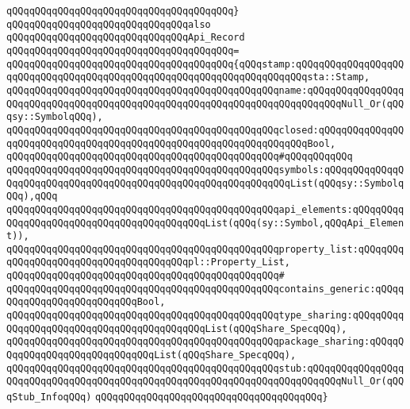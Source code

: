 \verb|qQQqqQQqqQQqqQQqqQQqqQQqqQQqqQQqqQQqqQQq}|\newline
\newline
\verb|qQQqqQQqqQQqqQQqqQQqqQQqqQQqqQQqalso|\newline
\verb|qQQqqQQqqQQqqQQqqQQqqQQqqQQqqQQqApi_Record|\newline
\verb|qQQqqQQqqQQqqQQqqQQqqQQqqQQqqQQqqQQqqQQq=|\newline
\verb|qQQqqQQqqQQqqQQqqQQqqQQqqQQqqQQqqQQqqQQq{qQQqstamp:qQQqqQQqqQQqqQQqqQQqqQQqqQQqqQQqqQQqqQQqqQQqqQQqqQQqqQQqqQQqqQQqqQQqqQQqsta::Stamp,|\newline
\verb|qQQqqQQqqQQqqQQqqQQqqQQqqQQqqQQqqQQqqQQqqQQqqQQqname:qQQqqQQqqQQqqQQqqQQqqQQqqQQqqQQqqQQqqQQqqQQqqQQqqQQqqQQqqQQqqQQqqQQqqQQqqQQqNull_Or(qQQqsy::SymbolqQQq),|\newline
\verb|qQQqqQQqqQQqqQQqqQQqqQQqqQQqqQQqqQQqqQQqqQQqqQQqclosed:qQQqqQQqqQQqqQQqqQQqqQQqqQQqqQQqqQQqqQQqqQQqqQQqqQQqqQQqqQQqqQQqqQQqBool,|\newline
\verb|qQQqqQQqqQQqqQQqqQQqqQQqqQQqqQQqqQQqqQQqqQQqqQQq#qQQqqQQqqQQq|\newline
\verb|qQQqqQQqqQQqqQQqqQQqqQQqqQQqqQQqqQQqqQQqqQQqqQQqsymbols:qQQqqQQqqQQqqQQqqQQqqQQqqQQqqQQqqQQqqQQqqQQqqQQqqQQqqQQqqQQqqQQqList(qQQqsy::SymbolqQQq),qQQq|\newline
\verb|qQQqqQQqqQQqqQQqqQQqqQQqqQQqqQQqqQQqqQQqqQQqqQQqapi_elements:qQQqqQQqqQQqqQQqqQQqqQQqqQQqqQQqqQQqqQQqqQQqList(qQQq(sy::Symbol,qQQqApi_Element)),|\newline
\verb|qQQqqQQqqQQqqQQqqQQqqQQqqQQqqQQqqQQqqQQqqQQqqQQqproperty_list:qQQqqQQqqQQqqQQqqQQqqQQqqQQqqQQqqQQqqQQqpl::Property_List,|\newline
\verb|qQQqqQQqqQQqqQQqqQQqqQQqqQQqqQQqqQQqqQQqqQQqqQQq#|\newline
\verb|qQQqqQQqqQQqqQQqqQQqqQQqqQQqqQQqqQQqqQQqqQQqqQQqcontains_generic:qQQqqQQqqQQqqQQqqQQqqQQqqQQqBool,|\newline
\verb|qQQqqQQqqQQqqQQqqQQqqQQqqQQqqQQqqQQqqQQqqQQqqQQqtype_sharing:qQQqqQQqqQQqqQQqqQQqqQQqqQQqqQQqqQQqqQQqqQQqList(qQQqShare_SpecqQQq),|\newline
\verb|qQQqqQQqqQQqqQQqqQQqqQQqqQQqqQQqqQQqqQQqqQQqqQQqpackage_sharing:qQQqqQQqqQQqqQQqqQQqqQQqqQQqqQQqList(qQQqShare_SpecqQQq),|\newline
\verb|qQQqqQQqqQQqqQQqqQQqqQQqqQQqqQQqqQQqqQQqqQQqqQQqstub:qQQqqQQqqQQqqQQqqQQqqQQqqQQqqQQqqQQqqQQqqQQqqQQqqQQqqQQqqQQqqQQqqQQqqQQqqQQqNull_Or(qQQqStub_InfoqQQq)|\newline
\verb|qQQqqQQqqQQqqQQqqQQqqQQqqQQqqQQqqQQqqQQq}|\newline
